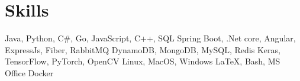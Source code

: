 \section{\textbf{Skills}}
\vspace{-0.4mm}
 \resumeHeadingSkillStart
    {Java, Python, C\#, Go, JavaScript, C++, SQL}
    {Spring Boot, .Net core, Angular, ExpressJs, Fiber, RabbitMQ}
    {DynamoDB,  MongoDB, MySQL, Redis}
    {Keras, TensorFlow, PyTorch, OpenCV}
    {Linux, MacOS, Windows}
    {\LaTeX, Bash, MS Office}
    {Docker}
 \resumeHeadingSkillEnd